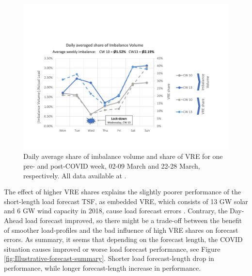 \documentclass[energies,article,submit,moreauthors,pdftex]{Definitions/mdpi}
\begin{document}
\begin{figure}[H]
\centering
\hspace{-25pt}\includegraphics[trim={0cm 2cm 2.5cm 4cm},clip,width=1\textwidth]{Graphics/Illustration-Imbalance-2weeks.pdf}
\caption{Daily average share of imbalance volume and share of VRE for one pre- and post-COVID week, 02-09 March and 22-28 March, respectively. All data available at \protect\cite{ELEXON2020ELEXONBMRS}.}\label{fig:ImbalanceVolume-daily}
\end{figure} 

The effect of higher VRE shares explains the slightly poorer performance of the short-length load forecast TSF, as embedded VRE, which consists of 13 GW solar and 6 GW wind capacity in 2018,  cause load forecast errors \cite{NationalgridESO2018QuarterlyMarch18, NationalGridESO2019EnergyRoadmap}. Contrary, the Day-Ahead load forecast improved, so there might be a trade-off between the benefit of smoother load-profiles and the bad influence of high VRE shares on forecast errors. As summary, it seems that depending on the forecast length, the COVID situation causes improved or worse load forecast performance, see Figure \ref{fig:Illustrative-forecast-summary}. Shorter load forecast-length drop in performance, while longer forecast-length increase in performance.
\end{document}
